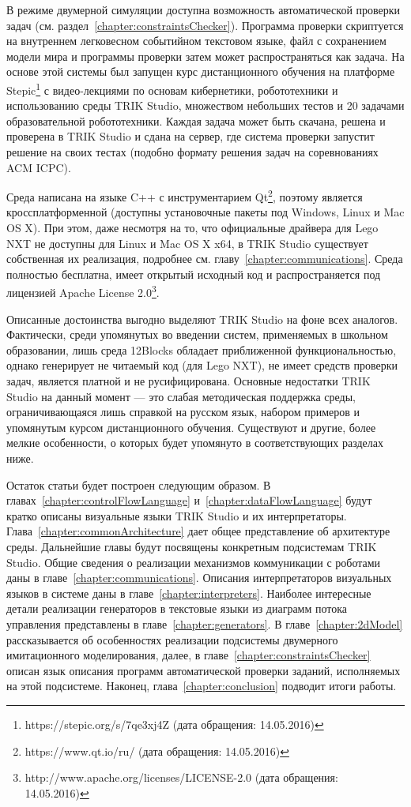 \documentclass[a5paper]{article}
\begin{document}
В режиме двумерной симуляции доступна возможность автоматической проверки задач (см. раздел~\ref{chapter:constraintsChecker}). Программа проверки скриптуется на внутреннем легковесном событийном текстовом языке, файл с сохранением модели мира и программы проверки затем может распространяться как задача. На основе этой системы был запущен курс дистанционного обучения на платформе Stepic\footnote{https://stepic.org/s/7qe3xj4Z  (дата обращения: 14.05.2016)} с видео-лекциями по основам кибернетики, робототехники и использованию среды TRIK Studio, множеством небольших тестов и 20 задачами образовательной робототехники. Каждая задача может быть скачана, решена и проверена в TRIK Studio и сдана на сервер, где система проверки запустит решение на своих тестах (подобно формату решения задач на соревнованиях ACM ICPC).

Среда написана на языке C++ с инструментарием Qt\footnote{https://www.qt.io/ru/ (дата обращения: 14.05.2016)}, поэтому является кроссплатформенной (доступны установочные пакеты под Windows, Linux и Mac OS X). При этом, даже несмотря на то, что официальные драйвера для Lego NXT не доступны для Linux и Mac OS X x64, в TRIK Studio существует собственная их реализация, подробнее см. главу~\ref{chapter:communications}. Среда полностью бесплатна, имеет открытый исходный код и распространяется под лицензией Apache License 2.0\footnote{http://www.apache.org/licenses/LICENSE-2.0  (дата обращения: 14.05.2016)}.

Описанные достоинства выгодно выделяют TRIK Studio на фоне всех аналогов. Фактически, среди упомянутых во введении систем, применяемых в школьном образовании, лишь среда 12Blocks обладает приближенной функциональностью, однако генерирует не читаемый код (для Lego NXT), не имеет средств проверки задач, является платной и не русифицирована. Основные недостатки TRIK Studio на данный момент --- это слабая методическая поддержка среды, ограничивающаяся лишь справкой на русском язык, набором примеров и упомянутым курсом дистанционного обучения. Существуют и другие, более мелкие особенности, о которых будет упомянуто в соответствующих разделах ниже.

Остаток статьи будет построен следующим образом. В главах~\ref{chapter:controlFlowLanguage} и~\ref{chapter:dataFlowLanguage} будут кратко описаны визуальные языки TRIK Studio и их интерпретаторы. Глава~\ref{chapter:commonArchitecture} дает общее представление об архитектуре среды. Дальнейшие главы будут посвящены конкретным подсистемам TRIK Studio. Общие сведения о реализации механизмов коммуникации с роботами даны в главе~\ref{chapter:communications}. Описания интерпретаторов визуальных языков в системе даны в главе~\ref{chapter:interpreters}. Наиболее интересные детали реализации генераторов в текстовые языки из диаграмм потока управления представлены в главе~\ref{chapter:generators}. В главе~\ref{chapter:2dModel} рассказывается об особенностях реализации подсистемы двумерного имитационного моделирования, далее, в главе~\ref{chapter:constraintsChecker} описан язык описания программ автоматической проверки заданий, исполняемых на этой подсистеме. Наконец, глава~\ref{chapter:conclusion} подводит итоги работы.
\end{document}
